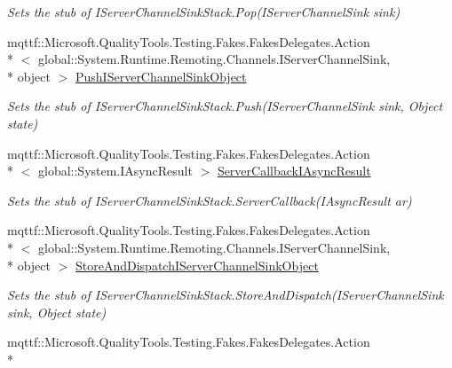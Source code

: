 \begin{DoxyCompactItemize}
\begin{DoxyCompactList}\small\item\em Sets the stub of I\-Server\-Channel\-Sink\-Stack.\-Pop(\-I\-Server\-Channel\-Sink sink)\end{DoxyCompactList}\item 
mqttf\-::\-Microsoft.\-Quality\-Tools.\-Testing.\-Fakes.\-Fakes\-Delegates.\-Action\\*
$<$ global\-::\-System.\-Runtime.\-Remoting.\-Channels.\-I\-Server\-Channel\-Sink, \\*
object $>$ \hyperlink{class_system_1_1_runtime_1_1_remoting_1_1_channels_1_1_fakes_1_1_stub_i_server_channel_sink_stack_ab93ac045e328074414bcb9a53273be13}{Push\-I\-Server\-Channel\-Sink\-Object}
\begin{DoxyCompactList}\small\item\em Sets the stub of I\-Server\-Channel\-Sink\-Stack.\-Push(\-I\-Server\-Channel\-Sink sink, Object state)\end{DoxyCompactList}\item 
mqttf\-::\-Microsoft.\-Quality\-Tools.\-Testing.\-Fakes.\-Fakes\-Delegates.\-Action\\*
$<$ global\-::\-System.\-I\-Async\-Result $>$ \hyperlink{class_system_1_1_runtime_1_1_remoting_1_1_channels_1_1_fakes_1_1_stub_i_server_channel_sink_stack_a4836f7abd133cc871da83b9aa2fcd2de}{Server\-Callback\-I\-Async\-Result}
\begin{DoxyCompactList}\small\item\em Sets the stub of I\-Server\-Channel\-Sink\-Stack.\-Server\-Callback(\-I\-Async\-Result ar)\end{DoxyCompactList}\item 
mqttf\-::\-Microsoft.\-Quality\-Tools.\-Testing.\-Fakes.\-Fakes\-Delegates.\-Action\\*
$<$ global\-::\-System.\-Runtime.\-Remoting.\-Channels.\-I\-Server\-Channel\-Sink, \\*
object $>$ \hyperlink{class_system_1_1_runtime_1_1_remoting_1_1_channels_1_1_fakes_1_1_stub_i_server_channel_sink_stack_ac6c01cf7b3378894f101a1ee94efc63d}{Store\-And\-Dispatch\-I\-Server\-Channel\-Sink\-Object}
\begin{DoxyCompactList}\small\item\em Sets the stub of I\-Server\-Channel\-Sink\-Stack.\-Store\-And\-Dispatch(\-I\-Server\-Channel\-Sink sink, Object state)\end{DoxyCompactList}\item 
mqttf\-::\-Microsoft.\-Quality\-Tools.\-Testing.\-Fakes.\-Fakes\-Delegates.\-Action\\*

\end{DoxyCompactItemize}
